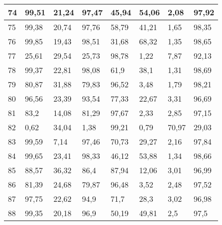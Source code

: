 \begin{longtable}[c]{|l|l|l|l|l|l|l|l|}
74              & 99,51        & 21,24        & 97,47       & 45,94         & 54,06         & 2,08          & 97,92         \\ \hline
75              & 99,38        & 20,74        & 97,76       & 58,79         & 41,21         & 1,65          & 98,35         \\ \hline
76              & 99,85        & 19,43        & 98,51       & 31,68         & 68,32         & 1,35          & 98,65         \\ \hline
77              & 25,61        & 29,54        & 25,73       & 98,78         & 1,22          & 7,87          & 92,13         \\ \hline
78              & 99,37        & 22,81        & 98,08       & 61,9          & 38,1          & 1,31          & 98,69         \\ \hline
79              & 80,87        & 31,88        & 79,83       & 96,52         & 3,48          & 1,79          & 98,21         \\ \hline
80              & 96,56        & 23,39        & 93,54       & 77,33         & 22,67         & 3,31          & 96,69         \\ \hline
81              & 83,2         & 14,08        & 81,29       & 97,67         & 2,33          & 2,85          & 97,15         \\ \hline
82              & 0,62         & 34,04        & 1,38        & 99,21         & 0,79          & 70,97         & 29,03         \\ \hline
83              & 99,59        & 7,14         & 97,46       & 70,73         & 29,27         & 2,16          & 97,84         \\ \hline
84              & 99,65        & 23,41        & 98,33       & 46,12         & 53,88         & 1,34          & 98,66         \\ \hline
85              & 88,57        & 36,32        & 86,4        & 87,94         & 12,06         & 3,01          & 96,99         \\ \hline
86              & 81,39        & 24,68        & 79,87       & 96,48         & 3,52          & 2,48          & 97,52         \\ \hline
87              & 97,75        & 22,62        & 94,9        & 71,7          & 28,3          & 3,02          & 96,98         \\ \hline
88              & 99,35        & 20,18        & 96,9        & 50,19         & 49,81         & 2,5           & 97,5          \\ \hline

\end{longtable}
